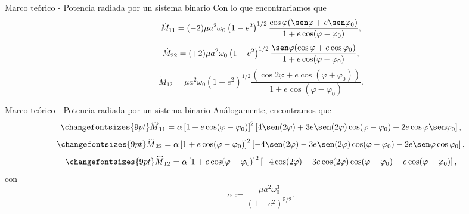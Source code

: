 \begin{frame}{Marco teórico - Potencia radiada por un sistema binario}
    Con lo que encontrariamos que 
\begin{equation*}
\dot{M}_{11}=(-2)\mu a^2\omega_0\left(1-e^2\right)^{1/2}\frac{\cos\varphi(\sen\varphi+e\sen\varphi_0)}{1+e\cos(\varphi-\varphi_0)},
\end{equation*}
\begin{equation*}
\dot{M}_{22}=(+2)\mu a^2\omega_0\left(1-e^2\right)^{1/2}\frac{\sen\varphi(\cos\varphi+e\cos\varphi_0)}{1+e\cos(\varphi-\varphi_0)},
\end{equation*}
\begin{equation*}
    \dot{M}_{12}=\mu a^2\omega_0\left(1-e^2\right)^{1/2}\frac{(\cos2\varphi+e\cos(\varphi+\varphi_0))}{1+e\cos(\varphi-\varphi_0)}.
\end{equation*}
\end{frame}
\begin{frame}{Marco teórico - Potencia radiada por un sistema binario}
Análogamente, encontramos que
\begin{equation}\label{eq:I11}
    \changefontsizes{9pt}
\dddot{M}_{11}=\alpha\left[1+e\cos(\varphi-\varphi_0)\right]^2 \left[4\sen(2\varphi)+3e\sen(2\varphi)\cos(\varphi-\varphi_0)
+2e\cos\varphi\sen\varphi_0\right],
\end{equation}
\begin{equation}\label{eq:I22}
    \changefontsizes{9pt}
\dddot{M}_{22}=\alpha\left[1+e\cos(\varphi-\varphi_0)\right]^2 \left[-4\sen(2\varphi)-3e\sen(2\varphi)\cos(\varphi-\varphi_0)
-2e\sen\varphi\cos\varphi_0\right],
\end{equation}
\begin{equation}\label{eq:I12}
    \changefontsizes{9pt}
\dddot{M}_{12}=\alpha\left[1+e\cos(\varphi-\varphi_0)\right]^2 \left[-4\cos(2\varphi)-3e\cos(2\varphi)\cos(\varphi-\varphi_0)
-e\cos(\varphi+\varphi_0)\right],
\end{equation}
con
\begin{equation*}
\alpha:=\frac{\mu a^2\omega_0^3}{\left(1-e^2\right)^{5/2}}.
\end{equation*}
\end{frame}
